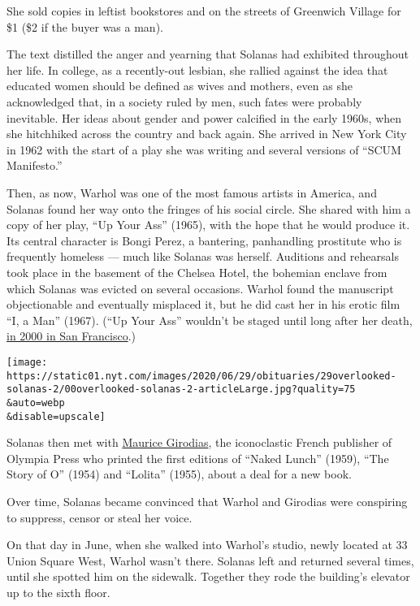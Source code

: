 She sold copies in leftist bookstores and on the streets of Greenwich
Village for \$1 (\$2 if the buyer was a man).

The text distilled the anger and yearning that Solanas had exhibited
throughout her life. In college, as a recently-out lesbian, she rallied
against the idea that educated women should be defined as wives and
mothers, even as she acknowledged that, in a society ruled by men, such
fates were probably inevitable. Her ideas about gender and power
calcified in the early 1960s, when she hitchhiked across the country and
back again. She arrived in New York City in 1962 with the start of a
play she was writing and several versions of ``SCUM Manifesto.''

Then, as now, Warhol was one of the most famous artists in America, and
Solanas found her way onto the fringes of his social circle. She shared
with him a copy of her play, ``Up Your Ass'' (1965), with the hope that
he would produce it. Its central character is Bongi Perez, a bantering,
panhandling prostitute who is frequently homeless --- much like Solanas
was herself. Auditions and rehearsals took place in the basement of the
Chelsea Hotel, the bohemian enclave from which Solanas was evicted on
several occasions. Warhol found the manuscript objectionable and
eventually misplaced it, but he did cast her in his erotic film ``I, a
Man'' (1967). (``Up Your Ass'' wouldn't be staged until long after her
death,
\href{https://www.villagevoice.com/2000/01/11/solanas-lost-and-found/}{in
2000 in San Francisco}.)

\texttt{[image: https://static01.nyt.com/images/2020/06/29/obituaries/29overlooked-solanas-2/00overlooked-solanas-2-articleLarge.jpg?quality=75\\\&auto=webp\\\&disable=upscale]}

Solanas then met with
\href{https://www.nytimes.com/1990/07/05/obituaries/maurice-girodias-a-french-publisher-and-an-author-71.html}{Maurice
Girodias}, the iconoclastic French publisher of Olympia Press who
printed the first editions of ``Naked Lunch'' (1959), ``The Story of O''
(1954) and ``Lolita'' (1955), about a deal for a new book.

Over time, Solanas became convinced that Warhol and Girodias were
conspiring to suppress, censor or steal her voice.

On that day in June, when she walked into Warhol's studio, newly located
at 33 Union Square West, Warhol wasn't there. Solanas left and returned
several times, until she spotted him on the sidewalk. Together they rode
the building's elevator up to the sixth floor.

